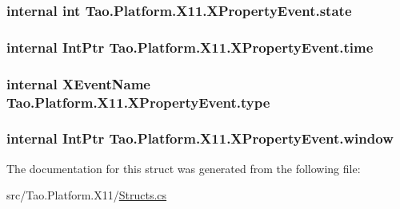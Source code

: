 \label{struct_tao_1_1_platform_1_1_x11_1_1_x_property_event_a08e3b7fb79dd99c1bbd6d26691d3f30d}
\hypertarget{struct_tao_1_1_platform_1_1_x11_1_1_x_property_event_acf33975eca9f44be0ab2b30a6baf41c5}{
\subsubsection[{state}]{\setlength{\rightskip}{0pt plus 5cm}internal int {\bf Tao.Platform.X11.XPropertyEvent.state}}}
\label{struct_tao_1_1_platform_1_1_x11_1_1_x_property_event_acf33975eca9f44be0ab2b30a6baf41c5}
\hypertarget{struct_tao_1_1_platform_1_1_x11_1_1_x_property_event_a90ce1efce45ed95d0b782f24f9310a7d}{
\subsubsection[{time}]{\setlength{\rightskip}{0pt plus 5cm}internal IntPtr {\bf Tao.Platform.X11.XPropertyEvent.time}}}
\label{struct_tao_1_1_platform_1_1_x11_1_1_x_property_event_a90ce1efce45ed95d0b782f24f9310a7d}
\hypertarget{struct_tao_1_1_platform_1_1_x11_1_1_x_property_event_ac5e72c53624186acb84f3976fd078feb}{
\subsubsection[{type}]{\setlength{\rightskip}{0pt plus 5cm}internal {\bf XEventName} {\bf Tao.Platform.X11.XPropertyEvent.type}}}
\label{struct_tao_1_1_platform_1_1_x11_1_1_x_property_event_ac5e72c53624186acb84f3976fd078feb}
\hypertarget{struct_tao_1_1_platform_1_1_x11_1_1_x_property_event_a4119919dd784782a78d1208a3ffccbc7}{
\subsubsection[{window}]{\setlength{\rightskip}{0pt plus 5cm}internal IntPtr {\bf Tao.Platform.X11.XPropertyEvent.window}}}
\label{struct_tao_1_1_platform_1_1_x11_1_1_x_property_event_a4119919dd784782a78d1208a3ffccbc7}


The documentation for this struct was generated from the following file:\begin{DoxyCompactItemize}
\item 
src/Tao.Platform.X11/\hyperlink{_structs_8cs}{Structs.cs}\end{DoxyCompactItemize}
